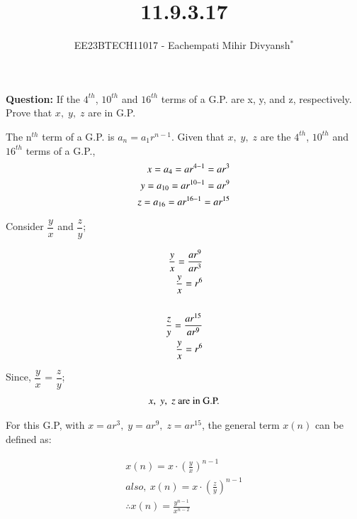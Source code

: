 \documentclass[journal,12pt,twocolumn]{IEEEtran}
\theoremstyle{remark}
\begin{document}

\vspace{3cm}

\title{11.9.3.17}
\author{EE23BTECH11017 - Eachempati Mihir Divyansh$^{*}$%
}
\maketitle
\newpage
\bigskip

\renewcommand{\thefigure}{\theenumi}
\renewcommand{\thetable}{\theenumi}

\textbf{Question: }
If the $4^{th}$, $10^{th}$ and $16^{th}$ terms of a G.P. are x, y, and z, respectively. Prove that $x,\; y,\; z$ are in G.P.\\
\solution

The n$^{th}$ term of a G.P. is $a_n=a_1r^{n-1}$. Given that $x,\; y,\; z$ are the $4^{th}$, $10^{th}$ and $16^{th}$ terms of a G.P.,
\begin{align}
\notag    x = a_4 =ar^{4-1}=ar^3 \\
\notag     y=a_{10}=ar^{10-1}=ar^9 \\
\notag     z=a_{16}=ar^{16-1}=ar^{15}
\end{align}

Consider $\dfrac{y}{x}$ and $\dfrac{z}{y}$;

\begin{align}
    \dfrac{y}{x} = \dfrac{ar^9}{ar^3} \\
    \dfrac{y}{x} = r^6\\ \notag\\
    \dfrac{z}{y} = \dfrac{ar^{15}}{ar^9} \\ 
    \dfrac{y}{x} = r^6
\end{align}

Since, $\dfrac{y}{x}$ = $\dfrac{z}{y}$;\\
\begin{align}  
\notag    x,\; y,\; z \text{ are in G.P.}
\end{align}

For this G.P, with $x=ar^{3},\;y=ar^{9},\;z=ar^{15}$, the general term $x(n)$ can be defined as: 

\begin{align}
	x(n)=x\cdot({\frac{y}{x}})^{n-1} \\
	also,\:x(n)=x\cdot (\frac{z}{y})^{n-1} \\
	\therefore x(n)=\frac{y^{n-1}}{x^{n-2}}
\end{align}
\end{document}
